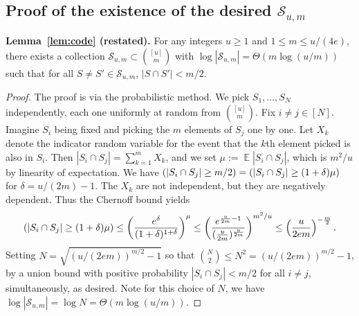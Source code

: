 \documentclass[11pt]{article}
\DeclareMathOperator*{\E}{\mathbb{E}}
\let\Pr\relax
\DeclareMathOperator*{\Pr}{\mathbb{P}}
\begin{document}
\subsection{Proof of the existence of the desired $\mathcal S_{u,m}$}\label{sec:code}
\noindent \textbf{Lemma~\ref{lem:code} (restated).}
For any integers $u\ge 1$ and $1\le m\le u/(4e)$, there exists a collection $\mathcal S_{u,m} \subset \binom{[u]}m$ with $\log |\mathcal{S}_{u,m}| = \Theta(m\log(u/m))$ such that for all $S\neq S'\in \mathcal S_{u,m}$, $|S\cap S'| < m/2$.
\begin{proof}
The proof is via the probabilistic method. We pick $S_1,\ldots,S_N$ independently, each one uniformly at random from $\binom{[u]}m$. Fix $i\neq j\in[N]$. Imagine $S_i$ being fixed and picking the $m$ elements of $S_j$ one by one. Let $X_k$ denote the indicator random variable for the event that the $k$th element picked is also in $S_i$. Then $|S_i\cap S_j| = \sum_{k=1}^m X_k$, and we set $\mu:= \E |S_i\cap S_j|$, which is $m^2/u$ by linearity of expectation. We have $\Pr(|S_i \cap S_j| \ge m/2) = \Pr(|S_i\cap S_j| \ge (1+\delta)\mu)$ for $\delta = u/(2m) - 1$. The $X_k$ are not independent, but they are negatively dependent. Thus the Chernoff bound yields
$$
\Pr(|S_i\cap S_j| \ge (1+\delta)\mu) \le \left(\frac{e^{\delta}}{(1+\delta)^{1+\delta}}\right)^\mu \le \left(\frac{e^{\frac u{2m} - 1}}{(\frac u{2m})^{\frac u{2m}}}\right)^{m^2/u} \le \left(\frac u{2em}\right)^{-\frac m2} .
$$
Setting $N = \sqrt{(u/(2em))^{m/2} - 1}$ so that ${N \choose 2}\leq N^2=(u/(2em))^{m/2} - 1$, by a union bound with positive probability $|S_i\cap S_j| < m/2$ for all $i\neq j$, simultaneously, as desired. Note for this choice of $N$, we have $\log|\mathcal S_{u,m}| = \log N = \Theta(m\log(u/m))$.
\end{proof}
\end{document}
